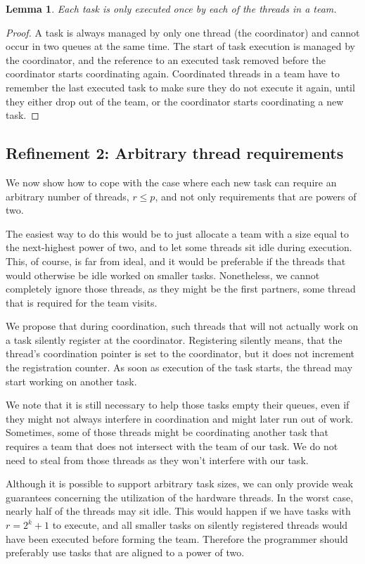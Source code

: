 \documentclass[preprint]{sigplanconf}
\newtheorem{lem}{Lemma}
\begin{document}
\begin{lem}
Each task is only executed once by each of the threads in a team.
\end{lem}

\begin{proof}
A task is always managed by only one thread (the coordinator) and
cannot occur in two queues at the same time. The start of task
execution is managed by the coordinator, and the reference to an
executed task removed before the coordinator starts coordinating
again. Coordinated threads in a team have to remember the last
executed task to make sure they do not execute it again, until they
either drop out of the team, or the coordinator starts coordinating a
new task.
\end{proof}

\subsection{Refinement 2: Arbitrary thread requirements}

We now show how to cope with the case where each new task can require
an arbitrary number of threads, $r\leq p$, and not only requirements
that are powers of two.

The easiest way to do this would be to just allocate a team with a
size equal to the next-highest power of two, and to let some threads
sit idle during execution. This, of course, is far from ideal, and it
would be preferable if the threads that would otherwise be idle worked
on smaller tasks. Nonetheless, we cannot completely ignore those
threads, as they might be the first partners, some thread that is
required for the team visits.

We propose that during coordination, such threads that will not
actually work on a task  silently register at the
coordinator. Registering silently means, that the thread's
coordination pointer is set to the coordinator, but it does not
increment the registration counter. As soon as execution of the task
starts, the thread may start working on another task.

We note that it is still necessary to help those tasks empty their
queues, even if they might not always interfere in coordination and
might later run out of work. Sometimes, some of those threads
might be coordinating another task that requires a team that does not
intersect with the team of our task. We do not need to steal from those
threads as they won't interfere with our task.

Although it is possible to support arbitrary task sizes, we can only
provide weak guarantees concerning the utilization of the hardware
threads. In the worst case, nearly half of the threads may sit
idle. This would happen if we have tasks with $r=2^{k}+1$ to execute,
and all smaller tasks on silently registered threads would have been
executed before forming the team. Therefore the programmer should
preferably use tasks that are aligned to a power of two.
\end{document}
